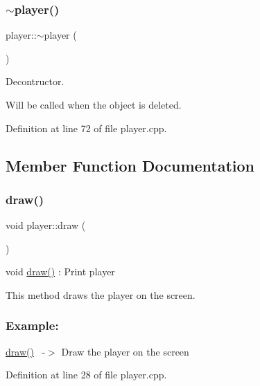 \subsubsection{\texorpdfstring{$\sim$player()}{~player()}}
{\footnotesize\ttfamily player\+::$\sim$player (\begin{DoxyParamCaption}{ }\end{DoxyParamCaption})}



Decontructor. 

Will be called when the object is deleted. ~\newline


Definition at line 72 of file player.\+cpp.



\subsection{Member Function Documentation}
\mbox{\label{classplayer_a67423ce10d4abb42775868f978d04247}} 
\subsubsection{\texorpdfstring{draw()}{draw()}}
{\footnotesize\ttfamily void player\+::draw (\begin{DoxyParamCaption}{ }\end{DoxyParamCaption})}



void \hyperlink{classplayer_a67423ce10d4abb42775868f978d04247}{draw()} \+: Print player 

This method draws the player on the screen. ~\newline
 \subsubsection*{Example\+: }

\hyperlink{classplayer_a67423ce10d4abb42775868f978d04247}{draw()}~\newline
-\/$>$ Draw the player on the screen 

Definition at line 28 of file player.\+cpp.

